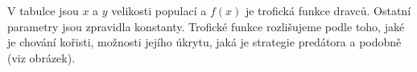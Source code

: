 \documentclass[handouts]{beamer}
\begin{document}
\begin{frame}
\begin{minipage}[t]{0.45\linewidth}
  \vspace*{0pt}
\end{minipage}


\bigskip
V tabulce jsou $x$ a $y$ velikosti populací a $f(x)$ je trofická funkce dravců. Ostatní parametry jsou zpravidla konstanty.
Trofické funkce rozlišujeme podle toho, jaké je chování kořisti, možnosti jejího úkrytu, jaká je strategie predátora a podobně (viz obrázek).

\end{frame}
\end{document}
